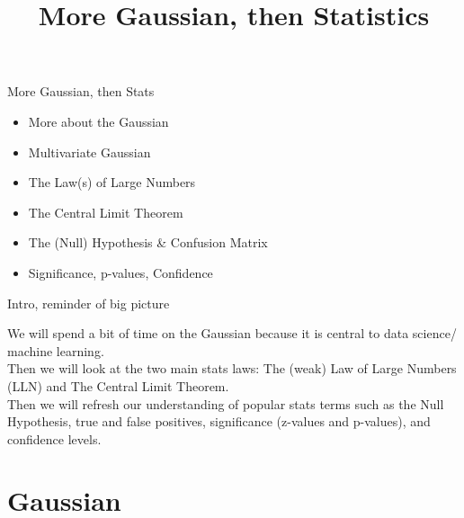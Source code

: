 \documentclass[10pt,sans,english,compress,xcolor=dvipsnames]{beamer}
\title[Stats]{More Gaussian, then Statistics}
\date{}
\begin{document}



\begin{frame}
\titlepage
\end{frame} 





\begin{frame}{More Gaussian, then Stats}
\large
\begin{itemize}
\item More about the Gaussian \\[1ex]
\item Multivariate Gaussian \\[1ex]
\item The Law(s) of Large Numbers \\[1ex]
\item The Central Limit Theorem \\[1ex]
\item The (Null) Hypothesis \& Confusion Matrix \\[1ex]
\item Significance, p-values, Confidence \\[1ex]

\end{itemize}

\end{frame} 


\begin{frame}{Intro, reminder of big picture}

\small

We will spend a bit of time on the Gaussian because it is central to data science/ machine learning.\\[2ex]

Then we will look at the two main stats laws: The (weak) Law of Large Numbers (LLN) and The Central Limit Theorem.\\[2ex]

Then we will refresh our understanding of popular stats terms such as the Null Hypothesis, true and false positives, significance (z-values and p-values), and confidence levels.\\[2ex]


\end{frame} 




\section{Gaussian}
\end{document}
